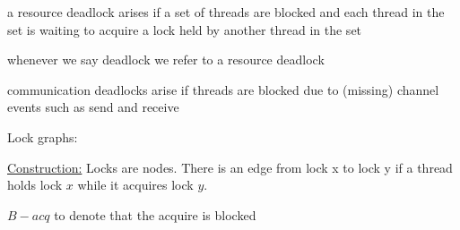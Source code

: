 \documentclass[landscape, a4paper]{article}
\begin{document}
\begin{minipage}[t]{0.2\linewidth}
\begin{betterlist}
		\item a \alert{resource deadlock} arises if a set of threads are blocked and each thread in the set is waiting to acquire a lock held by another thread in the set
		\begin{betterlist}
			\item whenever we say deadlock we refer to a resource deadlock
		\end{betterlist}
		\item \alert{communication deadlocks} arise if threads are blocked due to (missing) channel events such as send and receive
		\item \alert{Lock graphs}:
		\begin{betterlist}
			\item \underline{Construction:} Locks are nodes. There is an edge from lock x to lock y if a thread holds lock $x$ while it acquires lock $y$. 
			\begin{betterlist}
				\item $B-acq$ to denote that the acquire is blocked
			\end{betterlist}


\end{betterlist}
\end{betterlist}
\end{minipage}
\end{document}
